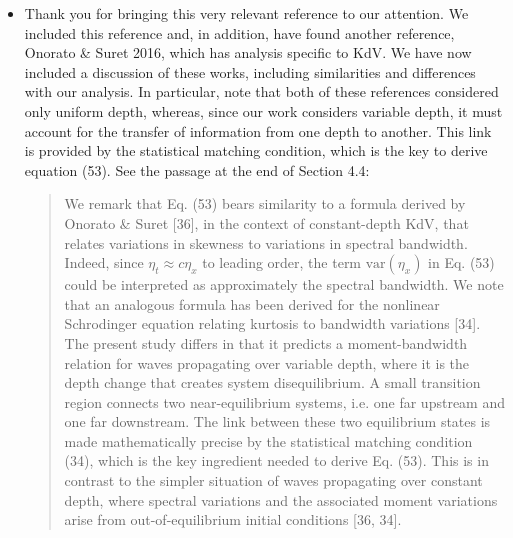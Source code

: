 \documentclass[11pt]{article}
\begin{document}
\begin{itemize}
\item Thank you for bringing this very relevant reference to our attention. We included this reference and, in addition, have found another reference, Onorato \& Suret 2016, which has analysis specific to KdV. We have now included a discussion of these works, including similarities and differences with our analysis. In particular, note that both of these references considered only uniform depth, whereas, since our work considers variable depth, it must account for the transfer of information from one depth to another. This link is provided by the statistical matching condition, which is the key to derive equation (53). See the passage at the end of Section 4.4:

\begin{quotation}
We remark that Eq. (53) bears similarity to a formula derived by Onorato \& Suret [36], in the context of constant-depth KdV, that relates variations in skewness to variations in spectral bandwidth. Indeed, since $\eta_t \approx c \eta_x$ to leading order, the term $\text{var}(\eta_x)$ in Eq. (53) could be interpreted as approximately the spectral bandwidth. We note that an analogous formula has been derived for the nonlinear Schrodinger equation relating kurtosis to bandwidth variations [34]. The present study differs in that it predicts a moment-bandwidth relation for waves propagating over variable depth, where it is the depth change that creates system disequilibrium. A small transition region connects two near-equilibrium systems, i.e. one far upstream and one far downstream. The link between these two equilibrium states is made mathematically precise by the statistical matching condition (34), which is the key ingredient needed to derive Eq. (53). This is in contrast to the simpler situation of waves propagating over constant depth, where spectral variations and the associated moment variations arise from out-of-equilibrium initial conditions [36, 34].
\end{quotation}

\end{itemize}
\end{document}
